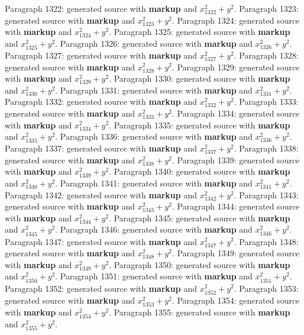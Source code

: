 \documentclass{article}
\begin{document}
Paragraph 1322: generated source with \textbf{markup} and $x_{1322}^2 + y^2$.
Paragraph 1323: generated source with \textbf{markup} and $x_{1323}^2 + y^2$.
Paragraph 1324: generated source with \textbf{markup} and $x_{1324}^2 + y^2$.
Paragraph 1325: generated source with \textbf{markup} and $x_{1325}^2 + y^2$.
Paragraph 1326: generated source with \textbf{markup} and $x_{1326}^2 + y^2$.
Paragraph 1327: generated source with \textbf{markup} and $x_{1327}^2 + y^2$.
Paragraph 1328: generated source with \textbf{markup} and $x_{1328}^2 + y^2$.
Paragraph 1329: generated source with \textbf{markup} and $x_{1329}^2 + y^2$.
Paragraph 1330: generated source with \textbf{markup} and $x_{1330}^2 + y^2$.
Paragraph 1331: generated source with \textbf{markup} and $x_{1331}^2 + y^2$.
Paragraph 1332: generated source with \textbf{markup} and $x_{1332}^2 + y^2$.
Paragraph 1333: generated source with \textbf{markup} and $x_{1333}^2 + y^2$.
Paragraph 1334: generated source with \textbf{markup} and $x_{1334}^2 + y^2$.
Paragraph 1335: generated source with \textbf{markup} and $x_{1335}^2 + y^2$.
Paragraph 1336: generated source with \textbf{markup} and $x_{1336}^2 + y^2$.
Paragraph 1337: generated source with \textbf{markup} and $x_{1337}^2 + y^2$.
Paragraph 1338: generated source with \textbf{markup} and $x_{1338}^2 + y^2$.
Paragraph 1339: generated source with \textbf{markup} and $x_{1339}^2 + y^2$.
Paragraph 1340: generated source with \textbf{markup} and $x_{1340}^2 + y^2$.
Paragraph 1341: generated source with \textbf{markup} and $x_{1341}^2 + y^2$.
Paragraph 1342: generated source with \textbf{markup} and $x_{1342}^2 + y^2$.
Paragraph 1343: generated source with \textbf{markup} and $x_{1343}^2 + y^2$.
Paragraph 1344: generated source with \textbf{markup} and $x_{1344}^2 + y^2$.
Paragraph 1345: generated source with \textbf{markup} and $x_{1345}^2 + y^2$.
Paragraph 1346: generated source with \textbf{markup} and $x_{1346}^2 + y^2$.
Paragraph 1347: generated source with \textbf{markup} and $x_{1347}^2 + y^2$.
Paragraph 1348: generated source with \textbf{markup} and $x_{1348}^2 + y^2$.
Paragraph 1349: generated source with \textbf{markup} and $x_{1349}^2 + y^2$.
Paragraph 1350: generated source with \textbf{markup} and $x_{1350}^2 + y^2$.
Paragraph 1351: generated source with \textbf{markup} and $x_{1351}^2 + y^2$.
Paragraph 1352: generated source with \textbf{markup} and $x_{1352}^2 + y^2$.
Paragraph 1353: generated source with \textbf{markup} and $x_{1353}^2 + y^2$.
Paragraph 1354: generated source with \textbf{markup} and $x_{1354}^2 + y^2$.
Paragraph 1355: generated source with \textbf{markup} and $x_{1355}^2 + y^2$.
\end{document}
